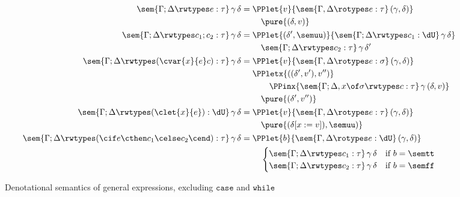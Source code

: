\begin{figure}
  \begin{mdframed}
  \centering
  \small
\begin{align*}
\sem{\Gamma; \Delta \rwtypes e : \tau} \, \gamma \, \delta &=
  \begin{aligned}[t]
   &\PPlet
     {v}
     {\sem{\Gamma, \Delta \rotypes e : \tau} \, (\gamma, \delta)} \\
             &
        \quad
     \pure{(\delta, v)}
    \end{aligned}
\\
\sem{\Gamma; \Delta \rwtypes c_1 ; c_2 : \tau} \, \gamma \, \delta &=
   \begin{aligned}[t]
   &\PPlet
     {(\delta', \semuu)}
     {\sem{\Gamma; \Delta \rwtypes c_1 : \dU} \, \gamma \, \delta} 
   \\
   &  
     \quad\sem{\Gamma; \Delta \rwtypes c_2 : \tau} \, \gamma \, \delta'
       \end{aligned}
\\
\sem{\Gamma ; \Delta \rwtypes (\cvar{x}{e} c) : \tau} \, \gamma \, \delta &=
  \begin{aligned}[t]
   &\PPlet
     {v}
     {\sem{\Gamma, \Delta \rotypes e : \sigma} \, (\gamma, \delta)}
   \\
   &
    \PPletx
     {((\delta', v'), v'')}
     \\
     &
     \qquad\PPinx{\sem{\Gamma; \Delta, x \of \sigma \rwtypes c : \tau} \, \gamma \, (\delta,v)}
   \\
    &
     \quad\pure{(\delta', v'')}
  \end{aligned}
\\
\sem{\Gamma ; \Delta \rwtypes (\clet{x}{e}) : \dU} \, \gamma \, \delta &=
  \begin{aligned}[t]
  &\PPlet
    {v}
    {\sem{\Gamma, \Delta \rotypes e : \tau} \, (\gamma, \delta)}
        \\
        &
        \quad
    \pure{(\delta[x :=v]), \semuu)}
    \end{aligned}
\\
\sem{\Gamma ; \Delta \rwtypes (\cif e \cthen c_1 \celse c_2 \cend) : \tau} \, \gamma \, \delta &=
  \begin{aligned}[t]
  &\PPlet
    {b}
    {\sem{\Gamma, \Delta \rotypes e : \dU} \, (\gamma, \delta)}
    \\
    & \quad \begin{cases}
    \sem{\Gamma; \Delta \rwtypes c_1 : \tau} \, \gamma \, \delta & \text{if $b = \semtt$} \\
     \sem{\Gamma; \Delta \rwtypes c_2 : \tau} \, \gamma \, \delta & \text{if $b = \semff$}
     \end{cases}
  \end{aligned}
\end{align*}
%
\end{mdframed}
\caption{Denotational semantics of general expressions, excluding $\mathtt{case}$ and $\mathtt{while}$}
\label{figure:rw-denotations}
\end{figure}

